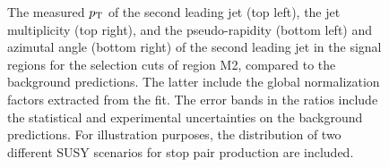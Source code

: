 \begin{figure}[!ht]
\begin{center}
{    }
  \end{center}
  \caption[Kinematic distributions of the $\pt$ of the second leading jet, the jet multiplicity, and the pseudo-rapidity and azimutal angle of the second leading jet in the signal regions for the selection cuts of region M2, after the normalization factors extracted from the fit have been applied.]
{The measured $\pt$ of the second leading jet (top left), the jet multiplicity (top right), and the pseudo-rapidity (bottom left) and azimutal angle (bottom right) of the second leading jet in the signal regions for the selection cuts of region M2, compared to the background predictions. The latter include the global normalization factors extracted from the fit. The error bands in the ratios include the statistical and experimental uncertainties on the background predictions. For illustration purposes, the distribution of two different SUSY scenarios for stop pair production are included.}
  \label{fig:Plot_M2_SR_Jet2}
\end{figure}

